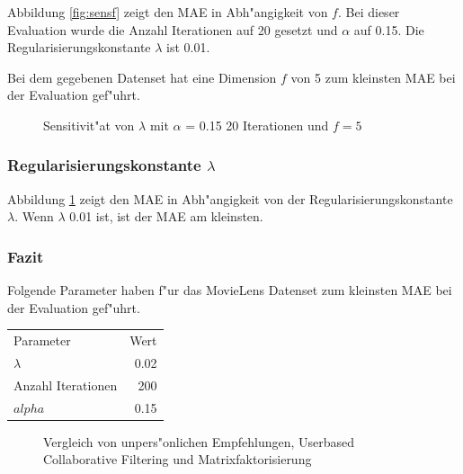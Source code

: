 \documentclass[a4paper, 12pt]{article}
\begin{document}
Abbildung \ref{fig:sensf} zeigt den MAE in Abh"angigkeit von $f$. Bei dieser Evaluation wurde die Anzahl Iterationen auf 20 gesetzt und $\alpha$ auf 0.15. Die Regularisierungskonstante $\lambda$ ist 0.01.

Bei dem gegebenen Datenset hat eine Dimension $f$ von 5 zum kleinsten MAE bei der Evaluation gef"uhrt.

\begin{figure}
  \centering
{}
\caption{Sensitivit"at von $\lambda$ mit $\alpha$ = 0.15 20 Iterationen und $f = 5$}
\label{fig:lambda}
\end{figure}

\subsubsection{Regularisierungskonstante $\lambda$}

Abbildung \ref{fig:lambda} zeigt den MAE in Abh"angigkeit von der Regularisierungskonstante $\lambda$. Wenn $\lambda$ 0.01 ist, ist der MAE am kleinsten.

\subsubsection{Fazit}

Folgende Parameter haben f"ur das MovieLens Datenset zum kleinsten MAE bei der Evaluation gef"uhrt.

\begin{center}
\begin{tabular}{lr}
 Parameter           &  Wert  \\
 $\lambda$              &  0.02  \\
 Anzahl Iterationen  &    200  \\
 $alpha$             &  0.15 \\
\end{tabular}
\end{center}

\begin{figure}
\centering
\caption{Vergleich von unpers"onlichen Empfehlungen, Userbased Collaborative Filtering und Matrixfaktorisierung}
\label{fig:compare}
\end{figure}
\end{document}
